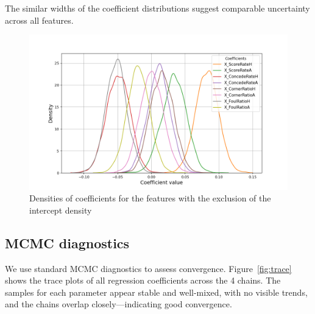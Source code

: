 \documentclass[9pt]{IEEEtran}
\begin{document}
The similar widths of the coefficient distributions suggest comparable 
uncertainty across all features.


\begin{figure}[h]
\centering
\includegraphics[width=1\columnwidth]{figures/densities.png}
\caption{Densities of coefficients for the features with the exclusion of the 
intercept density}
\label{fig:densities}
\end{figure}



\subsection{MCMC diagnostics}
We use standard MCMC diagnostics to assess convergence.
 Figure~\ref{fig:trace} shows the trace plots of all 
 regression coefficients across the 4 chains. The samples 
 for each parameter appear stable and well-mixed, with no 
 visible trends, and the chains overlap closely—indicating good convergence.
\end{document}
